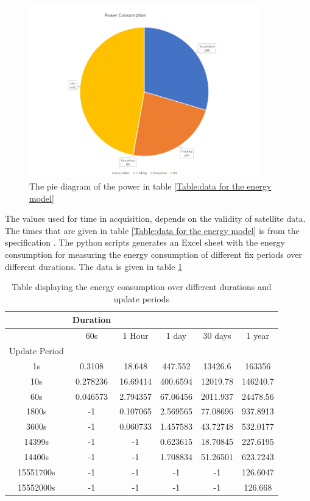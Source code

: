 \begin{figure}[H]
\centering
\includegraphics[height=7.5cm]{Project_Report/Images/powerconsump.PNG}
\caption{The pie diagram of the power in table \ref{Table:data for the energy model}}
\label{fig:powerconsumption}
\end{figure}

The values used for time in acquisition, depends on the validity of satellite data. The times that are given in table \ref{Table:data for the energy model} is from the specification \cite{L76}.
The python scripts generates an Excel sheet with the energy consumption for measuring the energy consumption of different fix periods over different durations. The data is given in table \ref{Table:energy}

\begin{table}[h!]
\begin{center}
 \begin{tabular}{||c c c c c c||} 
 \hline
 & Duration & & & & \\
 \hline
  & 60s & 1 Hour & 1 day & 30 days & 1 year \\
  Update Period & & & & &  \\[0.5ex] 
 \hline\hline
  1s & 0.3108 & 18.648 & 447.552 & 13426.6 & 163356 \\ 
 \hline
  10s & 0.278236 & 16.69414 & 400.6594 & 12019.78 & 146240.7 \\
 \hline
  60s & 0.046573 & 2.794357 & 67.06456 & 2011.937 & 24478.56 \\
 \hline
  1800s & -1 & 0.107065 & 2.569565 & 77.08696 & 937.8913 \\
  \hline
  3600s & -1 & 0.060733 & 1.457583 & 43.72748 & 532.0177 \\
  \hline
  14399s & -1 & -1 & 0.623615 & 18.70845 & 227.6195 \\
  \hline
  14400s & -1 & -1 & 1.708834 & 51.26501 & 623.7243\\
  \hline
  15551700s & -1 & -1 & -1 & -1 & 126.6047 \\
  \hline
  15552000s & -1 & -1 & -1 & -1 & 126.668 \\[1ex]
 \hline
\end{tabular}
\end{center}
\caption{Table displaying the energy consumption over different durations and update periods}
\label{Table:energy}
\end{table}


